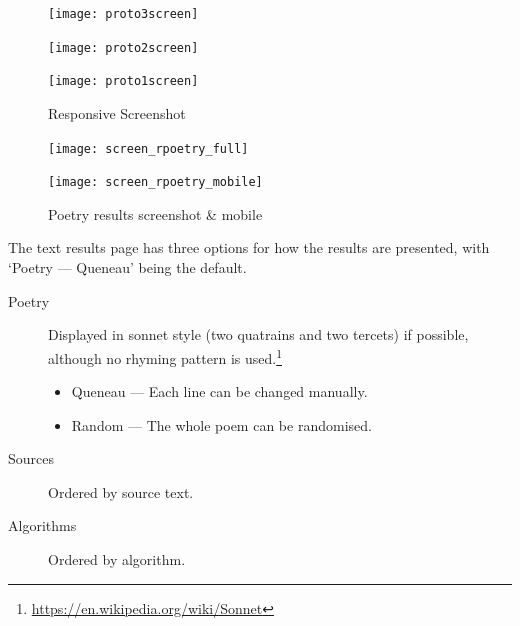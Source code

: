 \begin{figure}[!htbp]
  \centering
  \begin{minipage}{\linewidth}
    \texttt{[image: proto3screen]}
  \end{minipage}
  \hspace{.05\linewidth}
  \begin{minipage}{\linewidth}
    \texttt{[image: proto2screen]}
  \end{minipage}
  \hspace{.05\linewidth}
  \begin{minipage}{\linewidth}
    \texttt{[image: proto1screen]}
  \end{minipage}
  \caption[responsive screenshots]{Responsive Screenshot}
\label{Respscreenshots}
\end{figure}

\begin{figure}[!htbp]
  \centering
  \begin{minipage}{.57\linewidth}
    \texttt{[image: screen\_rpoetry\_full]}
  \end{minipage}
  \hspace{.05\linewidth}
  \begin{minipage}{.27\linewidth}
    \texttt{[image: screen\_rpoetry\_mobile]}
  \end{minipage}
  \caption[screenshots]{Poetry results screenshot \& mobile}
\label{screenshots}
\end{figure}

%

The text results page has three options for how the results are presented, with `Poetry --- Queneau' being the default.
\begin{description}
  \item [Poetry] Displayed in sonnet style (two quatrains and two tercets) if possible, although no rhyming pattern is used.\footnote{\url{https://en.wikipedia.org/wiki/Sonnet}}
    \begin{itemize}
      \item Queneau --- Each line can be changed manually.
      \item Random --- The whole poem can be randomised.
    \end{itemize}
  \item [Sources] Ordered by source text.
  \item [Algorithms] Ordered by algorithm.
\end{description}

